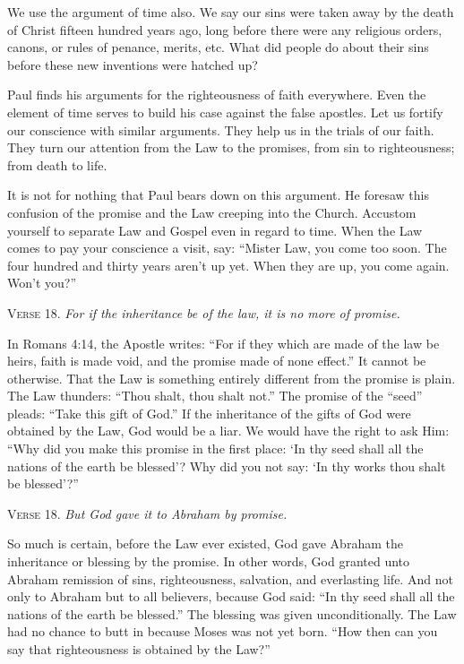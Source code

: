 We use the argument of time also. We say our sins were taken away by the death of Christ fifteen hundred years ago, long before there were any religious orders, canons, or rules of penance, merits, etc. What did people do about their sins before these new inventions were hatched up?

Paul finds his arguments for the righteousness of faith everywhere. Even the element of time serves to build his case against the false apostles. Let us fortify our conscience with similar arguments. They help us in the trials of our faith. They turn our attention from the Law to the promises, from sin to righteousness; from death to life.

It is not for nothing that Paul bears down on this argument. He foresaw this confusion of the promise and the Law creeping into the Church. Accustom yourself to separate Law and Gospel even in regard to time. When the Law comes to pay your conscience a visit, say: “Mister Law, you come too soon. The four hundred and thirty years aren’t up yet. When they are up, you come again. Won’t you?”

\textsc{Verse} 18. \emph{For if the inheritance be of the law, it is no more of promise.}

In Romans 4:14, the Apostle writes: “For if they which are made of the law be heirs, faith is made void, and the promise made of none effect.” It cannot be otherwise. That the Law is something entirely different from the promise is plain. The Law thunders: “Thou shalt, thou shalt not.” The promise of the “seed” pleads: “Take this gift of God.” If the inheritance of the gifts of God were obtained by the Law, God would be a liar. We would have the right to ask Him: “Why did you make this promise in the first place: ‘In thy seed shall all the nations of the earth be blessed’? Why did you not say: ‘In thy works thou shalt be blessed’?”

\textsc{Verse} 18. \emph{But God gave it to Abraham by promise.}

So much is certain, before the Law ever existed, God gave Abraham the inheritance or blessing by the promise. In other words, God granted unto Abraham remission of sins, righteousness, salvation, and everlasting life. And not only to Abraham but to all believers, because God said: “In thy seed shall all the nations of the earth be blessed.” The blessing was given unconditionally. The Law had no chance to butt in because Moses was not yet born. “How then can you say that righteousness is obtained by the Law?”

